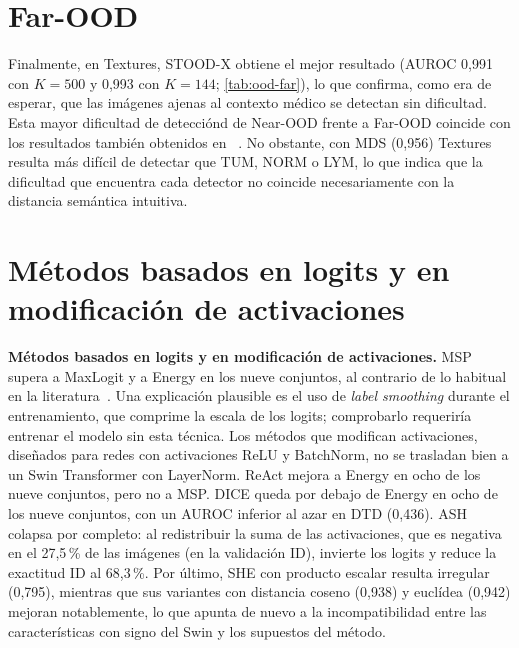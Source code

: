 \section{Far-OOD}\label{sec:ood-far}

Finalmente, en Textures, STOOD-X obtiene el mejor resultado (AUROC 0,991 con $K = 500$ y 0,993 con $K = 144$; \cref{tab:ood-far}), lo que confirma, como era de esperar, que las imágenes ajenas al contexto médico se detectan sin dificultad. 
Esta mayor dificultad de detecciónd de Near-OOD frente a Far-OOD coincide con los resultados también obtenidos en ~\cite{openood15}.
No obstante, con MDS (0,956) Textures resulta más difícil de detectar que TUM, NORM o LYM, lo que indica que la dificultad que encuentra cada detector no coincide necesariamente con la distancia semántica intuitiva.

\section{Métodos basados en logits y en modificación de activaciones}\label{sec:ood-familias}

\textbf{Métodos basados en logits y en modificación de activaciones.} MSP supera a MaxLogit y a Energy en los nueve conjuntos, al contrario de lo habitual en la literatura~\cite{liu2020energy}. Una explicación plausible es el uso de \emph{label smoothing} durante el entrenamiento, que comprime la escala de los logits; comprobarlo requeriría entrenar el modelo sin esta técnica. Los métodos que modifican activaciones, diseñados para redes con activaciones ReLU y BatchNorm, no se trasladan bien a un Swin Transformer con LayerNorm. ReAct mejora a Energy en ocho de los nueve conjuntos, pero no a MSP. DICE queda por debajo de Energy en ocho de los nueve conjuntos, con un AUROC inferior al azar en DTD (0,436). ASH colapsa por completo: al redistribuir la suma de las activaciones, que es negativa en el 27,5\,\% de las imágenes (en la validación ID), invierte los logits y reduce la exactitud ID al 68,3\,\%. Por último, SHE con producto escalar resulta irregular (0,795), mientras que sus variantes con distancia coseno (0,938) y euclídea (0,942) mejoran notablemente, lo que apunta de nuevo a la incompatibilidad entre las características con signo del Swin y los supuestos del método.




